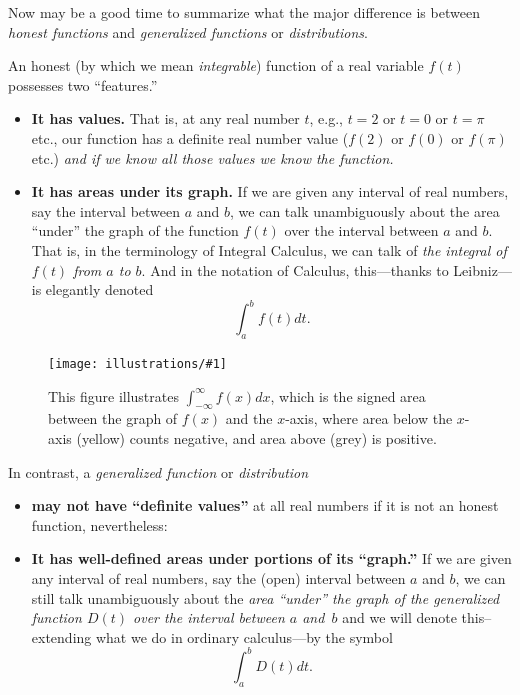 \documentclass[openany]{book}
\newcommand{\ill}[3]{%
   \begin{figure}[H]%
   \vspace{-2ex}
   \centering%
   \texttt{[image: illustrations/\#1]}%
   \caption{#3}%
   \vspace{-2ex}
    \end{figure}}
\theoremstyle{plain}
\theoremstyle{definition}
\begin{document}
{      Now may be a good time to summarize what the major difference is
      between {\it honest functions} and {\it generalized functions}
      or {\it distributions}.

      An honest (by which we mean {\it integrable}) function of a real
      variable $f(t)$ possesses two ``features.''


\begin{itemize}
\item {\bf It has values.}  That is, at any real number $t$, e.g., $t
  =2$ or $t =0$ or $t =\pi$ etc., our function has a definite real
  number value ($f(2)$ or $f(0)$ or $f(\pi)$ etc.) {\it and if we know
    all those values we know the function.}

\item {\bf It has areas under its graph.} If we are given any interval
  of real numbers, say the interval between $a$ and $b$, we can talk
  unambiguously about the area ``under'' the graph of the function
  $f(t)$ over the interval between $a$ and $b$.  That is, in the
  terminology of Integral Calculus, we can talk of {\it the integral of $f(t)$
    from $a$ to $b$}.  And in the notation of Calculus, this---thanks
  to Leibniz---is elegantly denoted
$$\int_a^bf(t)dt.$$

\end{itemize}

   \ill{oo_integral}{.8}{This figure illustrates
      $\int_{-\infty}^{\infty} f(x) dx$, which is the signed area
      between the graph of $f(x)$ and the $x$-axis, where area below
      the $x$-axis (yellow) counts negative, and area above (grey) is
      positive.}


In contrast, a {\it generalized function}  or  {\it distribution}~\begin{itemize}
\item {\bf may not have ``definite values''} at all real numbers if it
  is not an honest function, nevertheless:

\item {\bf It has well-defined areas under portions of its ``graph.''}
  If we are given any interval of real numbers, say the (open)
  interval between $a$ and $b$, we can still talk unambiguously about
  the {\it area ``under'' the graph of the generalized function $D(t)$
    over the interval between $a$ and~$b$} and we will denote
  this--extending what we do in ordinary calculus---by the symbol
$$\int_a^bD(t)dt.$$
\end{itemize}

}
\end{document}
